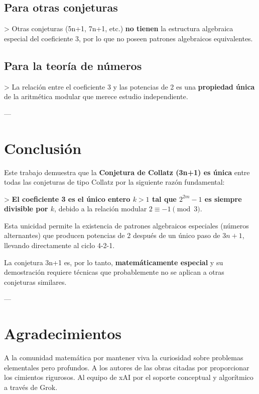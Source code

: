 \documentclass[11pt,a4paper]{article}
\begin{document}
\subsection{Para otras conjeturas}
> Otras conjeturas (5n+1, 7n+1, etc.) \textbf{no tienen} la estructura algebraica especial del coeficiente 3, por lo que no poseen patrones algebraicos equivalentes.

\subsection{Para la teoría de números}
> La relación entre el coeficiente 3 y las potencias de 2 es una \textbf{propiedad única} de la aritmética modular que merece estudio independiente.

---

\section{Conclusión}

Este trabajo demuestra que la \textbf{Conjetura de Collatz (3n+1) es única} entre todas las conjeturas de tipo Collatz por la siguiente razón fundamental:

> \textbf{El coeficiente 3 es el único entero \( k > 1 \) tal que \( 2^{2m} - 1 \) es siempre divisible por \( k \)}, debido a la relación modular \( 2 \equiv -1 \pmod{3} \).

Esta unicidad permite la existencia de patrones algebraicos especiales (números alternantes) que producen potencias de 2 después de un único paso de \( 3n + 1 \), llevando directamente al ciclo 4-2-1.

La conjetura 3n+1 es, por lo tanto, \textbf{matemáticamente especial} y su demostración requiere técnicas que probablemente no se aplican a otras conjeturas similares.

---

\section*{Agradecimientos}
A la comunidad matemática por mantener viva la curiosidad sobre problemas elementales pero profundos. A los autores de las obras citadas por proporcionar los cimientos rigurosos. Al equipo de xAI por el soporte conceptual y algorítmico a través de Grok.
\end{document}
